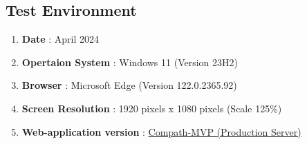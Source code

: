 \subsection{Test Environment}
\begin{enumerate}
    \item \textbf{Date} : April 2024
    \item \textbf{Opertaion System} : Windows 11 (Version 23H2)
    \item \textbf{Browser} : Microsoft Edge (Version 122.0.2365.92)
    \item \textbf{Screen Resolution} : 1920 pixels x 1080 pixels (Scale 125\%)
    \item \textbf{Web-application version} : \href{https://compath-cpe.web.app/}{Compath-MVP (Production Server)}
\end{enumerate}
